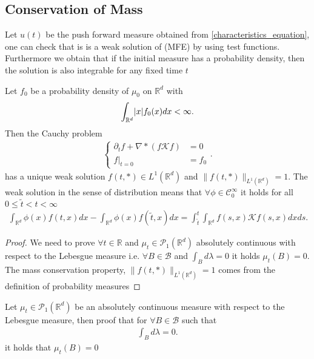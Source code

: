 \subsection{Conservation of Mass}
Let $u(t)$ be the push forward measure obtained from \autoref{characteristics_equation}, one can check that is is a weak solution of (MFE) by using 
test functions. Furthermore we obtain that if the initial measure has a probability density, then the solution is also integrable 
for any fixed time $t$ 
\begin{corollary}
 Let $f_{0}$ be a probability density of $\mu_0$ on $\mathbb{R}^{d}$ with 
 \begin{align*}
   \int_{\mathbb{R}^{d} } \lvert x\rvert f_0(x) dx < \infty
 .\end{align*}
 Then the Cauchy problem 
 \begin{align*}
  \begin{cases}
    \partial_t f + \nabla * (f \mathcal{K} f)  &= 0\\
    f\rvert_{t=0} &= f_{0}
  \end{cases}
 .\end{align*}
 has a unique weak solution $f(t,*) \in  L^{1}(\mathbb{R}^{d} ) $ and $\|f(t,*)\|_{L^{1}(\mathbb{R}^{d} ) } = 1$. The weak solution in 
 the sense of distribution means that $\forall  \phi  \in  \mathcal{C}_0^{\infty} $ it holds for all $0\le \tilde{t}<t<\infty$
 \begin{align*}
   \int_{\mathbb{R}^{d} }\phi(x) f(t,x) dx - \int_{\mathbb{R}^{d} }\phi(x)f(\tilde{t},x )dx = \int_{\tilde{t} }^{t} \int_{\mathbb{R}^{d} }  f(s,x) \mathcal{K}f(s,x) dx ds
 .\end{align*}
\end{corollary}
\begin{proof}
 We need to prove $\forall  t \in  \mathbb{R}$ and $\mu_t \in  \mathcal{P}_1(\mathbb{R}^{d} )$ absolutely continuous with respect to the 
 Lebesgue measure i.e. $\forall  B \in  \mathcal{B}$ and $\int_{B} d\lambda  = 0$ it holds $\mu_t(B) = 0$.
 The mass conservation property, $\|f(t,*)\|_{L^{1}(\mathbb{R}^{d} ) } = 1$  comes from the definition of probability measures
\end{proof}
\begin{exercise}
 Let $\mu_t \in  \mathcal{P}_1(\mathbb{R}^{d} )$  be an absolutely continuous measure with respect to the Lebesgue measure,
 then proof that for $\forall  B \in  \mathcal{B}$ such that 
 \begin{align*}
  \int_B d\lambda  = 0
 .\end{align*}
 it holds that $\mu_t(B) = 0$
\end{exercise}
